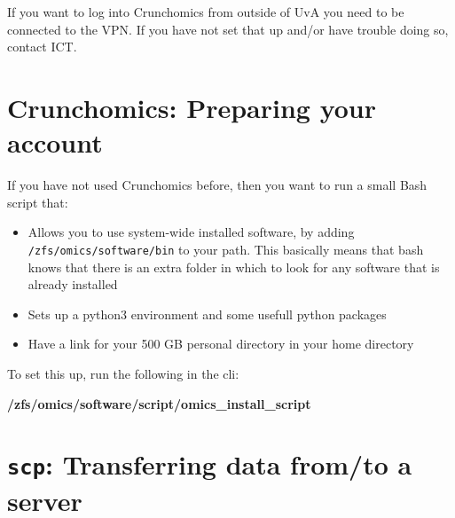 \documentclass[
  letterpaper,
  DIV=11,
  numbers=noendperiod]{scrreprt}
\newenvironment{Shaded}{}{}
\newcommand{\ExtensionTok}[1]{\textcolor[rgb]{0.84,0.23,0.29}{\textbf{#1}}}
\providecommand{\tightlist}{%
  \setlength{\itemsep}{0pt}\setlength{\parskip}{0pt}}\usepackage{longtable,booktabs,array}
\begin{document}
\begin{tcolorbox}[enhanced jigsaw, coltitle=black, leftrule=.75mm, colback=white, toptitle=1mm, breakable, toprule=.15mm, colbacktitle=quarto-callout-important-color!10!white, bottomtitle=1mm, arc=.35mm, opacitybacktitle=0.6, bottomrule=.15mm, titlerule=0mm, title=\textcolor{quarto-callout-important-color}{\faExclamation}\hspace{0.5em}{Important}, rightrule=.15mm, left=2mm, colframe=quarto-callout-important-color-frame, opacityback=0]

If you want to log into Crunchomics from outside of UvA you need to be
connected to the VPN. If you have not set that up and/or have trouble
doing so, contact ICT.

\end{tcolorbox}

\section{Crunchomics: Preparing your
account}\label{crunchomics-preparing-your-account}

If you have not used Crunchomics before, then you want to run a small
Bash script that:

\begin{itemize}
\tightlist
\item
  Allows you to use system-wide installed software, by adding
  \texttt{/zfs/omics/software/bin} to your path. This basically means
  that bash knows that there is an extra folder in which to look for any
  software that is already installed
\item
  Sets up a python3 environment and some usefull python packages
\item
  Have a link for your 500 GB personal directory in your home directory
\end{itemize}

To set this up, run the following in the cli:

\begin{Shaded}
\begin{Highlighting}[]
\ExtensionTok{/zfs/omics/software/script/omics\_install\_script}
\end{Highlighting}
\end{Shaded}

\section{\texorpdfstring{\texttt{scp}: Transferring data from/to a
server}{scp: Transferring data from/to a server}}\label{scp-transferring-data-fromto-a-server}
\end{document}
